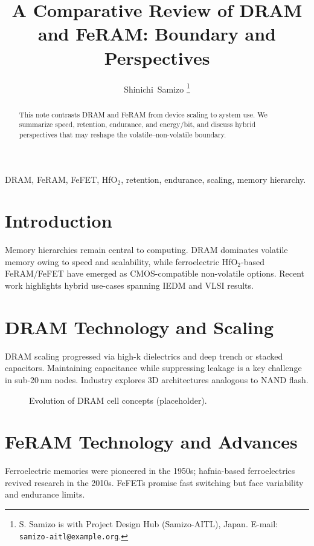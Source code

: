 \documentclass[journal]{IEEEtran}
\title{A Comparative Review of DRAM and FeRAM: Boundary and Perspectives}
\author{Shinichi~Samizo%
\thanks{S. Samizo is with Project Design Hub (Samizo-AITL), Japan. E-mail: \texttt{samizo-aitl@example.org}.}
}
\begin{document}
\maketitle

\begin{abstract}
This note contrasts DRAM and FeRAM from device scaling to system use. We summarize speed, retention, endurance, and energy/bit, and discuss hybrid perspectives that may reshape the volatile--non-volatile boundary.
\end{abstract}

\begin{IEEEkeywords}
DRAM, FeRAM, FeFET, HfO$_2$, retention, endurance, scaling, memory hierarchy.
\end{IEEEkeywords}

\section{Introduction}
Memory hierarchies remain central to computing. DRAM dominates volatile memory owing to speed and scalability, while ferroelectric HfO$_2$-based FeRAM/FeFET have emerged as CMOS-compatible non-volatile options. Recent work highlights hybrid use-cases spanning IEDM and VLSI results.

\section{DRAM Technology and Scaling}
DRAM scaling progressed via high-k dielectrics and deep trench or stacked capacitors. Maintaining capacitance while suppressing leakage is a key challenge in sub-20\,nm nodes. Industry explores 3D architectures analogous to NAND flash.

\begin{figure}[!t]
\centering
{}
\caption{Evolution of DRAM cell concepts (placeholder).}
\label{fig:dram_evolution}
\end{figure}

\section{FeRAM Technology and Advances}
Ferroelectric memories were pioneered in the 1950s; hafnia-based ferroelectrics revived research in the 2010s. FeFETs promise fast switching but face variability and endurance limits.
\end{document}
